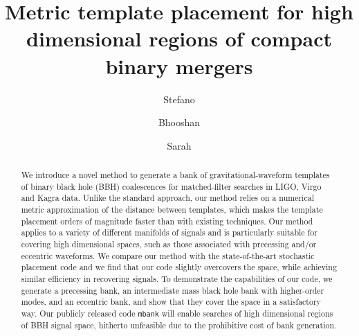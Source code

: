 \documentclass[twocolumn,showpacs,preprintnumbers,nofootinbib,prd,
superscriptaddress,10pt]{revtex4-2}
\begin{document}
\begin{abstract}
	We introduce a novel method to generate a bank of gravitational-waveform templates of binary black hole (BBH) coalescences for matched-filter searches in LIGO, Virgo and Kagra data. Unlike the standard approach, our method relies on a numerical metric approximation of the distance between templates, which makes the template placement orders of magnitude faster than with existing techniques.
	Our method applies to a variety of different manifolds of signals and is particularly suitable for covering high dimensional spaces, such as those associated with precessing and/or eccentric waveforms.
	We compare our method with the state-of-the-art stochastic placement code and we find that our code slightly overcovers the space, while achieving similar efficiency in recovering signals. To demonstrate the capabilities of our code, we generate a precessing bank, an intermediate mass black hole bank with higher-order modes, and an eccentric bank, and show that they cover the space in a satisfactory way.
	Our publicly released code \texttt{mbank} will enable searches of high dimensional regions of BBH signal space, hitherto unfeasible due to the prohibitive cost of bank generation.
\end{abstract}
	
	\title{Metric template placement for high dimensional regions of compact binary mergers}
	\author{Stefano }

	\author{Bhooshan }
        
	\author{Sarah }
	\maketitle
\end{document}
